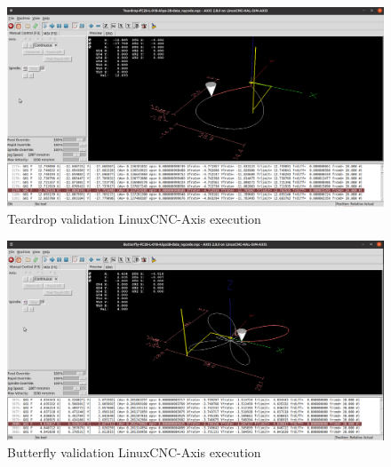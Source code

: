 \clearpage
\pagebreak
\begin{landscape}
	
	\begin{figure}
		\centering
		\caption  {Teardrop validation LinuxCNC-Axis execution}
		\label{img-Teardrop validation LinuxCNC-Axis execution}
		\includegraphics[width=1.65\textwidth]{Chap4/Validation/Teardrop/Teardrop-FC20-L-018-Algo28-CNC-Validation-Screenshot_2023-10-09_10-00-49.png} 
	\end{figure}
	
\end{landscape}

\clearpage
\pagebreak
\begin{landscape}
	
	\begin{figure}
		\centering
		\caption  {Butterfly validation LinuxCNC-Axis execution}
		\label{img-Butterfly validation LinuxCNC-Axis execution}
		\includegraphics[width=1.65\textwidth]{Chap4/Validation/Butterfly/Butterfly-FC20-L-018-Algo28-CNC-Validation-Screenshot_2023-10-09_10-19-54.png} 
	\end{figure}	
	
\end{landscape}

